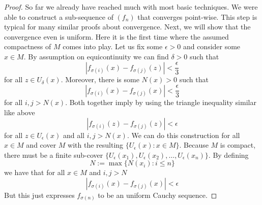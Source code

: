 \documentclass[17pt]{extarticle}
\begin{document}
\begin{proof}
    So far we already have reached much with most basic techniques. We were able to construct a sub-sequence of $(f_n)$ that converges point-wise. This step is typical for many similar proofs about convergence.
    Next, we will show that the convergence even is uniform. Here it is the first time where the assumed
    compactness of $M$ comes into play. Let us fix some $\epsilon>0$ and consider some $x\in M$.
    By assumption on equicontinuity we can find $\delta>0$ such that 
    $$|f_{\sigma(i)}(x)-f_{\sigma(j)}(z)|<\frac{\epsilon}{3}$$
    for all $z\in U_{\delta}(x)$. Moreover, there is some $N(x)>0$ such that 
    $$|f_{\sigma(i)}(x)-f_{\sigma(j)}(x)|<\frac{\epsilon}{3}$$
    for all $i,j>N(x)$.
    Both together imply by using the triangle inequality similar like above
    $$|f_{\sigma(i)}(z)-f_{\sigma(j)}(z)|<\epsilon$$
    for all $z\in U_{\epsilon}(x)$ and all $i,j>N(x)$.
    We can do this construction for all $x\in M$ and cover $M$ with the resulting
    $\{U_{\epsilon}(x): x\in M\}$. Because $M$ is compact, there must be a finite sub-cover
    $\{U_{\epsilon}(x_1), U_{\epsilon}(x_2), \dots, U_{\epsilon}(x_n) \}$.
    By defining
    $$N:=\max\{N(x_i): i \leq n\}$$ we have that for all $x\in M$
    and $i,j>N$
    $$|f_{\sigma(i)}(x)-f_{\sigma(j)}(x)|<\epsilon$$
    But this just expresses $f_{\sigma(n)}$ to be an uniform Cauchy sequence.	
\end{proof}
\end{document}
